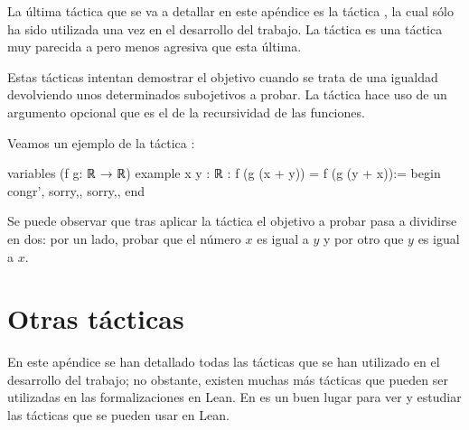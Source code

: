 La última táctica que se va a detallar en este apéndice es la táctica
, la cual sólo ha sido utilizada una vez en el
desarrollo del trabajo. La táctica  es una
táctica muy parecida a  pero menos agresiva que
esta última.

Estas tácticas intentan demostrar el objetivo cuando se trata de una
igualdad devolviendo unos determinados subojetivos a probar. La táctica
 hace uso de un argumento opcional que es el de
la recursividad de las funciones.

Veamos un ejemplo de la táctica :

\begin{leancode}
variables (f g: ℝ → ℝ)
example {x y : ℝ} : f (g (x + y)) = f (g (y + x)):=
begin
  congr',
  {sorry,},
  {sorry,},
end
\end{leancode}

Se puede observar que tras aplicar la táctica 
el objetivo a probar pasa a dividirse en dos: por un lado, probar que el
número \(x\) es igual a \(y\) y por otro que \(y\) es igual a \(x\).

\section{Otras tácticas}

En este apéndice se han detallado todas las tácticas que se han
utilizado en el desarrollo del trabajo; no obstante, existen muchas más
tácticas que pueden ser utilizadas en las formalizaciones en Lean. En
\cite{tactic} es un buen lugar para ver y estudiar las tácticas que se
pueden usar en Lean.
